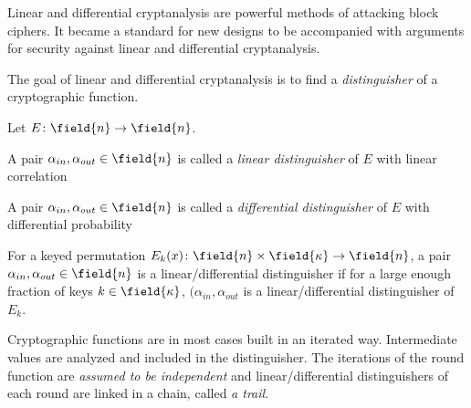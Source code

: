 
Linear and differential cryptanalysis are powerful methods of attacking block ciphers. It became a standard for new designs to be accompanied with arguments for security against linear and differential cryptanalysis.

The goal of linear and differential cryptanalysis is to find a \emph{distinguisher} of a cryptographic function. 

\begin{definition}
Let $E\colon \field{n} \to \field{n}$.

A pair $\alpha_{in},\alpha_{out}\in \field{n}$ is called a \emph{linear distinguisher} of $E$ with linear correlation

A pair $\alpha_{in},\alpha_{out}\in \field{n}$ is called a \emph{differential distinguisher} of $E$ with differential probability

For a keyed permutation $E_k(x)\colon \field{n} \times \field{\kappa} \to \field{n}$, a pair $\alpha_{in},\alpha_{out}\in \field{n}$ is a linear/differential distinguisher if for a large enough fraction of keys $k \in \field{\kappa}$, $(\alpha_{in}, \alpha_{out}$ is a linear/differential distinguisher of $E_k$.
\end{definition}

Cryptographic functions are in most cases built in an iterated way.  Intermediate values are analyzed and included in the distinguisher. The iterations of the round function are \emph{assumed to be independent} and linear/differential distinguishers of each round are linked in a chain, called \emph{a trail}.

\newcommand\vf{\mathbf{f}}
\newcommand\valpha{\boldsymbol{\alpha}}

